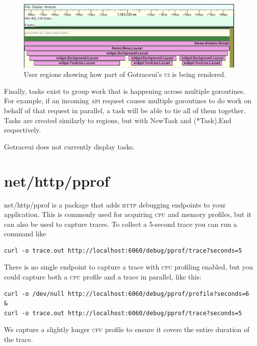 \documentclass[10pt,letterpaper,oneside,openany,english]{memoir}
\newcommand{\code}[1]{{\ttfamily\mbox{#1}}}
\begin{document}
\begin{figure}[h]
  \centering
  \includegraphics[width=\textwidth]{images/screenshots/user-regions.png}
  \caption{User regions showing how part of Gotraceui's \textsc{ui} is being rendered.}
\end{figure}

Finally, tasks exist to group work that is happening across multiple goroutines.
For example, if an incoming \textsc{api} request causes multiple goroutines to do work on behalf of that request in parallel, a task will be able to tie all of them together.
Tasks are created similarly to regions, but with \code{NewTask} and \code{(*Task).End} respectively.

Gotraceui does not currently display tasks.

\section{\code{net/http/pprof}}\label{net-http-pprof}

\code{net/http/pprof} is a package that adds \textsc{http} debugging endpoints to your application.
This is commonly used for acquiring \textsc{cpu} and memory profiles, but it can also be used to capture traces.
To collect a 5-second trace you can run a command like

\begin{verbatim}
curl -o trace.out http://localhost:6060/debug/pprof/trace?seconds=5
\end{verbatim}

There is no single endpoint to capture a trace with \textsc{cpu} profiling enabled, but you could capture both a \textsc{cpu} profile and a trace in parallel, like this:

\begin{verbatim}
curl -o /dev/null http://localhost:6060/debug/pprof/profile?seconds=6 &
curl -o trace.out http://localhost:6060/debug/pprof/trace?seconds=5
\end{verbatim}

We capture a slightly longer \textsc{cpu} profile to ensure it covers the entire duration of the trace.
\end{document}
